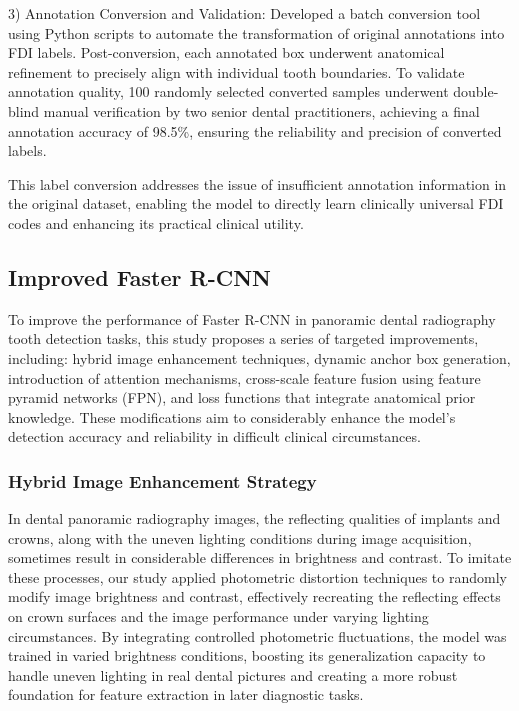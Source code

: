 \documentclass[pdflatex,sn-mathphys-num]{sn-jnl}%
\theoremstyle{thmstyleone}%
\theoremstyle{thmstyletwo}%
\theoremstyle{thmstylethree}%
\begin{document}
3) Annotation Conversion and Validation: Developed a batch conversion tool using Python scripts to automate the transformation of original annotations into FDI labels. Post-conversion, each annotated box underwent anatomical refinement to precisely align with individual tooth boundaries. To validate annotation quality, 100 randomly selected converted samples underwent double-blind manual verification by two senior dental practitioners, achieving a final annotation accuracy of 98.5\%, ensuring the reliability and precision of converted labels.

This label conversion addresses the issue of insufficient annotation information in the original dataset, enabling the model to directly learn clinically universal FDI codes and enhancing its practical clinical utility.

\subsection{Improved Faster R-CNN}

To improve the performance of Faster R-CNN in panoramic dental radiography tooth detection tasks, this study proposes a series of targeted improvements, including: hybrid image enhancement techniques, dynamic anchor box generation, introduction of attention mechanisms, cross-scale feature fusion using feature pyramid networks (FPN), and loss functions that integrate anatomical prior knowledge.  These modifications aim to considerably enhance the model's detection accuracy and reliability in difficult clinical circumstances.

\subsubsection{Hybrid Image Enhancement Strategy }

In dental panoramic radiography images, the reflecting qualities of implants and crowns, along with the uneven lighting conditions during image acquisition, sometimes result in considerable differences in brightness and contrast.  To imitate these processes, our study applied photometric distortion techniques to randomly modify image brightness and contrast, effectively recreating the reflecting effects on crown surfaces and the image performance under varying lighting circumstances.  By integrating controlled photometric fluctuations, the model was trained in varied brightness conditions, boosting its generalization capacity to handle uneven lighting in real dental pictures and creating a more robust foundation for feature extraction in later diagnostic tasks.
\end{document}
